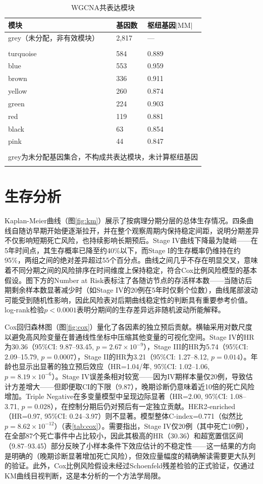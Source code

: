 \documentclass[12pt,a4paper,openany]{ctexbook}
\begin{document}
\begin{table}[H]
\centering\caption{WGCNA共表达模块}\label{tab:wgcna}
\begin{tabular}{lll}\toprule
模块 & 基因数 & 枢纽基因$|\text{MM}|$ \\\midrule
grey（未分配，非有效模块） & 2,817 & — \\\\
turquoise & 584 & 0.889 \\
blue & 553 & 0.959 \\
brown & 336 & 0.911 \\
yellow & 260 & 0.874 \\
green & 224 & 0.903 \\
red & 119 & 0.881 \\
black & 63 & 0.854 \\
pink & 44 & 0.847 \\\\\midrule\multicolumn{3}{l}{\footnotesize *grey为未分配基因集合，不构成共表达模块，未计算枢纽基因} \\\\\bottomrule
\end{tabular}
\end{table}

\section{生存分析}
Kaplan-Meier曲线（图\ref{fig:km}）展示了按病理分期分层的总体生存情况。四条曲线自随访早期开始便逐渐拉开，并在整个观察周期内保持稳定间距，说明分期差异不仅影响短期死亡风险，也持续影响长期预后。Stage IV曲线下降最为陡峭——在5年时间点，其生存概率已降至约40\%以下，而Stage I的生存概率仍维持在约95\%，两组之间的绝对差异超过55个百分点。曲线之间几乎不存在明显交叉，意味着不同分期之间的风险排序在时间维度上保持稳定，符合Cox比例风险模型的基本假设。图下方的Number at Risk表标注了各随访节点的存活样本数——当随访后期剩余样本数显著减少时（如Stage IV的20例在5年时仅剩个位数），曲线尾部波动可能受到随机性影响，因此风险表对后期曲线稳定性的判断具有重要参考价值。log-rank检验$p<0.0001$表明分期间的生存差异远非随机波动所能解释。

Cox回归森林图（图\ref{fig:cox}）量化了各因素的独立预后贡献。横轴采用对数尺度以避免高风险变量在普通线性坐标中压缩其他变量的可视化空间。Stage IV的HR为30.36（95\%CI: 9.87--93.45, $p=2.67\times10^{-9}$），Stage III的HR为5.74（95\%CI: 2.09--15.79, $p=0.0007$），Stage II的HR为3.21（95\%CI: 1.27--8.12, $p=0.014$）。年龄也显示出显著的独立预后效应（HR=1.04/年, 95\%CI: 1.02--1.06, $p=8.19\times10^{-6}$）。Stage IV误差条相对较宽——因为IV期样本量仅20例，导致估计方差增大——但即便取CI的下限（9.87），晚期诊断仍意味着近10倍的死亡风险增加。Triple Negative在多变量模型中呈现边际显著（HR=2.00, 95\%CI: 1.08--3.71, $p=0.028$），在控制分期后仍对预后有一定独立贡献。HER2-enriched（HR=0.97, 95\%CI: 0.24--3.97）则不显著。模型整体C-index=0.771（似然比$p=8.62\times10^{-12}$）（表\ref{tab:cox}）。需要指出，Stage IV仅20例（其中死亡10例），在全部87个死亡事件中占比较小，因此其极高的HR（30.36）和超宽置信区间（9.87--93.45）部分反映了小样本条件下效应估计的不稳定性——这一结果的方向是明确的（晚期诊断显著增加死亡风险），但效应量幅度的精确解读需要更大队列的验证。此外，Cox比例风险假设未经过Schoenfeld残差检验的正式验证，仅通过KM曲线目视判断，这是本分析的一个方法学局限。
\end{document}
